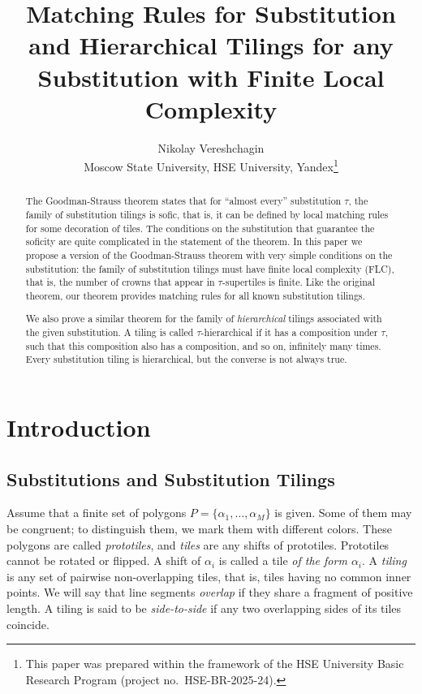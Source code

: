 \documentclass[12pt]{article}
\date{}
\title{Matching Rules for Substitution and 
Hierarchical Tilings for any Substitution with Finite Local Complexity}
\author{Nikolay Vereshchagin\\
  Moscow State University, HSE University,
  Yandex\thanks{This paper was prepared within the framework of the HSE University Basic Research Program (project no.~HSE-BR-2025-24).}}
\theoremstyle{remark}
\begin{document}
\maketitle

\begin{abstract}
The Goodman-Strauss theorem states that for ``almost every'' substitution $\tau$, 
the family of substitution tilings is sofic, that is, it can be defined by local matching rules 
for some decoration of tiles. The 
conditions on the substitution that guarantee the soficity 
are quite complicated in the statement of the theorem.  
In this paper we propose a version of the Goodman-Strauss theorem with very simple conditions on the substitution:
the family of substitution tilings must have finite local complexity (FLC), that is, 
the number of crowns that appear in $\tau$-supertiles is finite.
Like the original theorem, our theorem provides matching rules for 
all known substitution tilings. 

We also prove a similar theorem for the family of \emph{hierarchical} tilings associated with the given substitution. 
A tiling is called $\tau$-hierarchical if it has a composition under $\tau$, such that this composition also has a composition, 
and so on, infinitely many times. Every substitution tiling is hierarchical, but the converse is not always true. 
\end{abstract}
\section{Introduction}

\subsection{Substitutions and Substitution Tilings}



Assume that a  finite set of polygons $P=\{\alpha_1,\dots,\alpha_M\}$ is given. 
Some of them may be congruent; to distinguish them, we  
mark them with different colors. These polygons are called \emph{prototiles}, and \emph{tiles} are any shifts of prototiles.
Prototiles cannot be rotated or flipped.
A shift of $\alpha_i$ is called a tile \emph{of the form $\alpha_i$}.
A \emph{tiling} is any set of pairwise non-overlapping  tiles, that is, tiles having no common inner points. 
We will say that line segments \emph{overlap} if they share a fragment of positive length. 
 A tiling is said to be \emph{side-to-side} 
if any two overlapping sides of its  tiles coincide. 
\end{document}
